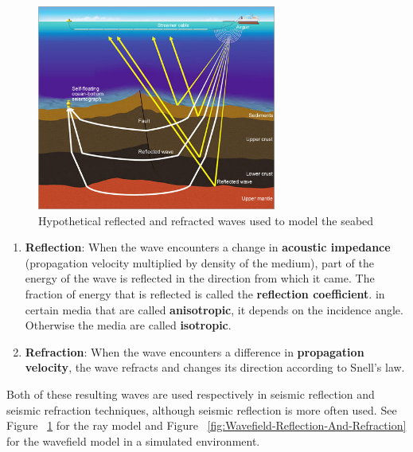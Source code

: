 \begin{figure}[ht]
	\centering
	\includegraphics[width=0.7\textwidth]{Images/seabed_img_01.jpg}
	\caption{Hypothetical reflected and refracted waves used to model the seabed}
	\label{fig:Rays-Reflection-And-Refraction}
\end{figure}

\begin{enumerate}
	\item
	\textbf{Reflection}: When the wave encounters a change in \textbf{acoustic impedance} (propagation velocity multiplied by density of the medium), part of the energy of the wave is reflected in the direction from which it came. The fraction of energy that is reflected is called the \textbf{reflection coefficient}. in certain media that are called \textbf{anisotropic}, it depends on the incidence angle. Otherwise the media are called \textbf{isotropic}.
	\item
	\textbf{Refraction}: When the wave encounters a difference in \textbf{propagation velocity}, the wave refracts and changes its direction according to Snell's law. 
\end{enumerate}

Both of these resulting waves are used respectively in seismic reflection and seismic refraction techniques, although seismic reflection is more often used. See Figure ~\ref{fig:Rays-Reflection-And-Refraction} for the ray model and Figure ~\ref{fig:Wavefield-Reflection-And-Refraction} for the wavefield model in a simulated environment.

